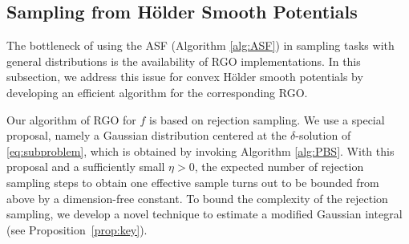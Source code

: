 \documentclass[11pt,letterpaper]{article}
\newcommand{\chen}{\color{cyan}}
\newcommand{\R}{\mathbb{R}}
\begin{document}
\subsection{Sampling from Hölder Smooth Potentials}\label{sec:RGO}

The bottleneck of using the ASF (Algorithm \ref{alg:ASF}) in sampling tasks with general distributions is the availability of RGO implementations.
In this subsection, we address this issue for convex Hölder smooth potentials by developing an efficient algorithm for the corresponding RGO. 

Our algorithm of RGO for $f$ is based on rejection sampling. We use a special proposal, namely a Gaussian distribution centered at the $\delta$-solution of \eqref{eq:subproblem}, which is obtained by invoking Algorithm \ref{alg:PBS}.
With this proposal and a sufficiently small $\eta>0$, the expected number of rejection sampling steps to obtain one effective sample turns out to be bounded from above by a dimension-free constant. 
To bound the complexity of the rejection sampling, we develop a novel technique to estimate a modified Gaussian integral (see Proposition~\ref{prop:key}). 






\end{document}
